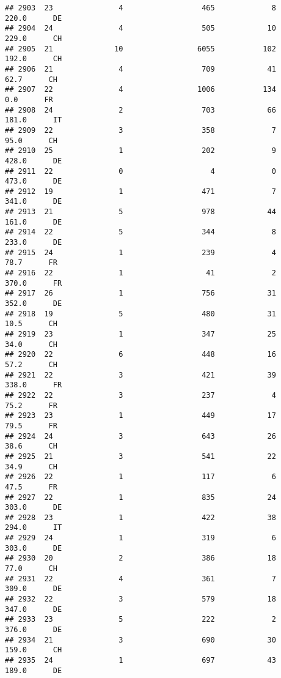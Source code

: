 \documentclass[
]{article}
\begin{document}
\begin{verbatim}
## 2903  23               4                  465             8    220.0      DE
## 2904  24               4                  505            10    229.0      CH
## 2905  21              10                 6055           102    192.0      CH
## 2906  21               4                  709            41     62.7      CH
## 2907  22               4                 1006           134      0.0      FR
## 2908  24               2                  703            66    181.0      IT
## 2909  22               3                  358             7     95.0      CH
## 2910  25               1                  202             9    428.0      DE
## 2911  22               0                    4             0    473.0      DE
## 2912  19               1                  471             7    341.0      DE
## 2913  21               5                  978            44    161.0      DE
## 2914  22               5                  344             8    233.0      DE
## 2915  24               1                  239             4     78.7      FR
## 2916  22               1                   41             2    370.0      FR
## 2917  26               1                  756            31    352.0      DE
## 2918  19               5                  480            31     10.5      CH
## 2919  23               1                  347            25     34.0      CH
## 2920  22               6                  448            16     57.2      CH
## 2921  22               3                  421            39    338.0      FR
## 2922  22               3                  237             4     75.2      FR
## 2923  23               1                  449            17     79.5      FR
## 2924  24               3                  643            26     38.6      CH
## 2925  21               3                  541            22     34.9      CH
## 2926  22               1                  117             6     47.5      FR
## 2927  22               1                  835            24    303.0      DE
## 2928  23               1                  422            38    294.0      IT
## 2929  24               1                  319             6    303.0      DE
## 2930  20               2                  386            18     77.0      CH
## 2931  22               4                  361             7    309.0      DE
## 2932  22               3                  579            18    347.0      DE
## 2933  23               5                  222             2    376.0      DE
## 2934  21               3                  690            30    159.0      CH
## 2935  24               1                  697            43    189.0      DE

\end{verbatim}
\end{document}
